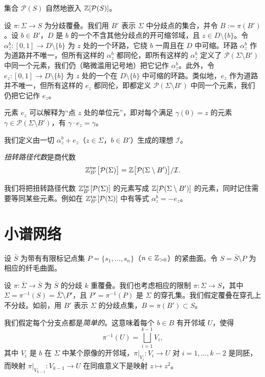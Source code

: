 
集合 $\mathcal{P}(S)$ 自然地嵌入 $\mathbb{Z}[\mathcal{P}(S)]$。

设 $\pi\colon\Sigma\to S$ 为分歧覆叠。我们用 $B'$ 表示 $\Sigma$ 中分歧点的集合，并令 $B:=\pi(B')$。设 $b\in B'$，$D$ 是 $b$ 的一个不含其他分歧点的开可缩邻域，且 $z\in D\setminus\{b\}$。令 $\alpha_z^b\colon[0,1]\to D\setminus\{b\}$ 为 $z$ 处的一个环路，它绕 $b$ 一周且在 $D$ 中可缩。环路 $\alpha_z^b$ 作为道路并不唯一，但所有这样的 $\alpha_z^b$ 都同伦，即所有这样的 $\alpha_z^b$ 定义了 $\mathcal{P}(\Sigma\setminus B')$ 中同一个元素，我们仍（略微滥用记号地）把它记作 $\alpha_z^b$。此外，令 $e_z\colon[0,1]\to D\setminus\{b\}$ 为 $z$ 处的一个在 $D\setminus\{b\}$ 中可缩的环路。类似地，$e_z$ 作为道路并不唯一，但所有这样的 $e_z$ 都同伦，即都定义 $\mathcal{P}(\Sigma\setminus B')$ 中同一个元素，我们仍把它记作 $e_z$。

元素 $e_z$ 可以解释为“点 $z$ 处的单位元”，即对每个满足 $\gamma(0)=z$ 的元素 $\gamma\in\mathcal{P}(\Sigma\setminus B')$，有 $\gamma\cdot e_z=\gamma$。

我们定义由一切 $\alpha_z^b+e_z$（$z\in\Sigma$，$b\in B'$）生成的理想 $\mathcal{I}$。

\begin{definition}[13.6]
\emph{扭转路径代数}是商代数
\[
\mathbb{Z}^{\mathrm{tw}}_{B'}\bigl[\mathcal{P}(\Sigma)\bigr]=\mathbb{Z}\bigl[\mathcal{P}(\Sigma\setminus B')\bigr]/\mathcal{I}.
\]
\end{definition}

我们将把扭转路径代数 $\mathbb{Z}^{\mathrm{tw}}_{B'}[\mathcal{P}(\Sigma)]$ 的元素写成 $\mathbb{Z}[\mathcal{P}(\Sigma\setminus B')]$ 的元素，同时记住需要等同某些元素。例如在 $\mathbb{Z}^{\mathrm{tw}}_{B'}[\mathcal{P}(\Sigma)]$ 中有等式 $\alpha_z^b=-e_z$。

\section{小谱网络}

设 $\bar S$ 为带有有限标记点集 $P=\{s_1,\dots,s_n\}$（$n\in\mathbb{Z}_{>0}$）的紧曲面。令 $S=\bar S\setminus P$ 为相应的纤毛曲面。

设 $\pi\colon\bar\Sigma\to\bar S$ 为 $\bar S$ 的分歧 $k$ 重覆叠。我们也考虑相应的限制 $\pi\colon\Sigma\to S$，其中 $\Sigma=\pi^{-1}(S)=\bar\Sigma\setminus P'$，且 $P'=\pi^{-1}(P)$ 是 $\Sigma$ 的穿孔集。我们假定覆叠在穿孔上不分歧。如前，用 $B'$ 表示 $\Sigma$ 的分歧点集，$B=\pi(B')\subset S$。

我们假定每个分支点都是\emph{简单的}。这意味着每个 $b\in B$ 有开邻域 $U$，使得
\[
\pi^{-1}(U)=\bigsqcup_{i=1}^{k-1}V_i,
\]
其中 $V_i$ 是 $b$ 在 $\Sigma$ 中某个原像的开邻域，$\pi|_{V_i}\colon V_i\to U$ 对 $i=1,\dots,k-2$ 是同胚，而映射 $\pi|_{V_{k-1}}\colon V_{k-1}\to U$ 在同痕意义下是映射 $z\mapsto z^2$。

